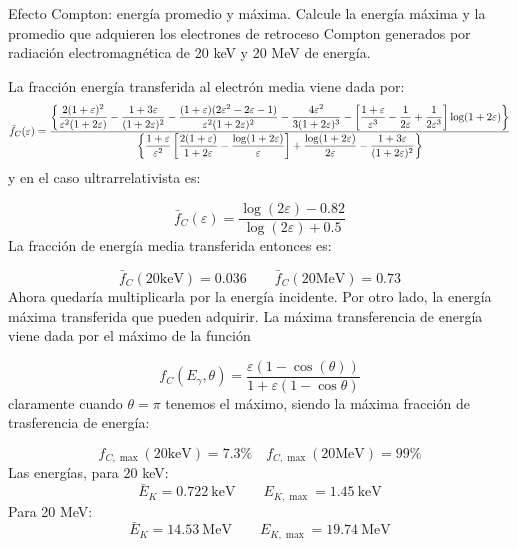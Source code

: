 \begin{Ejercicio}{Efecto Compton: energía promedio y máxima.} 
    Calcule la energía máxima y la promedio que adquieren los electrones de retroceso Compton generados por radiación electromagnética de 20 keV y 20 MeV de energía.
\end{Ejercicio}

La fracción energía transferida al electrón media viene dada por: 
\begin{equation} \scriptsize
\bar{f}_C(\varepsilon) =
\frac{
\left\{
\dfrac{2(1+\varepsilon)^2}{\varepsilon^2(1+2\varepsilon)}
- \dfrac{1+3\varepsilon}{(1+2\varepsilon)^2}
- \dfrac{(1+\varepsilon)(2\varepsilon^2 - 2\varepsilon - 1)}{\varepsilon^2(1+2\varepsilon)^2}
- \dfrac{4\varepsilon^2}{3(1+2\varepsilon)^3}
- \left[\dfrac{1+\varepsilon}{\varepsilon^3} - \dfrac{1}{2\varepsilon} + \dfrac{1}{2\varepsilon^3}\right] \log(1+2\varepsilon)
\right\}
}{
\left\{
\dfrac{1+\varepsilon}{\varepsilon^2} \left[\dfrac{2(1+\varepsilon)}{1+2\varepsilon} - \dfrac{\log(1+2\varepsilon)}{\varepsilon}\right]
+ \dfrac{\log(1+2\varepsilon)}{2\varepsilon}
- \dfrac{1+3\varepsilon}{(1+2\varepsilon)^2}
\right\}
}
\end{equation}
y en el caso ultrarrelativista es: 

\begin{equation} 
\bar{f}_C(\varepsilon) = \frac{\log (2\varepsilon)-0.82}{\log(2\varepsilon)+0.5}
\end{equation}
La fracción de energía media transferida entonces es: 

\begin{equation*}
    \bar{f}_C(20\text{keV}) = 0.036 \qquad 
    \bar{f}_C(20\text{MeV}) = 0.73
\end{equation*}
Ahora quedaría multiplicarla por la energía incidente. Por otro lado, la energía máxima transferida que pueden adquirir. La máxima transferencia de energía viene dada por el máximo de la función

\begin{equation*}
    f_C(E_\gamma,\theta) = \frac{\varepsilon(1-\cos(\theta))}{1+\varepsilon(1-\cos \theta)}
\end{equation*}
claramente cuando $\theta=\pi$ tenemos el máximo, siendo la máxima fracción de trasferencia de energía: 

\begin{equation*}
   f_{C,\max}(20\text{keV}) = 7.3 \%   \quad 
    f_{C,\max}(20\text{MeV}) = 99\%
\end{equation*}
Las energías, para $20$ keV:
\begin{equation*}
    \bar{E}_K = 0.722 \ \text{keV} \qquad  E_{K,\max}= 1.45 \ \text{keV}
\end{equation*}
Para 20 MeV: 
\begin{equation*}
    \bar{E}_K = 14.53 \  \text{MeV} \qquad  E_{K,\max}= 19.74 \ \text{MeV}
\end{equation*}



